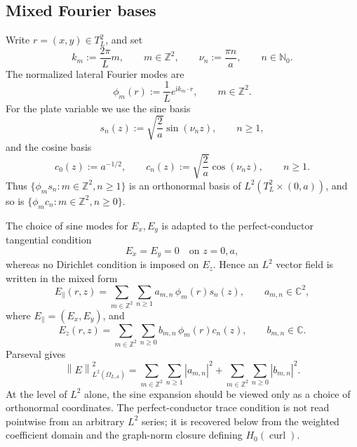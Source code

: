 \documentclass[11pt]{article}
\providecommand{\C}{\mathbb{C}}
\providecommand{\Z}{\mathbb{Z}}
\providecommand{\N}{\mathbb{N}}
\providecommand{\ii}{\mathrm{i}}
\providecommand{\abs}[1]{\left\lvert #1\right\rvert}
\providecommand{\norm}[1]{\left\lVert #1\right\rVert}
\providecommand{\OmegaLa}{\Omega_{L,a}}
\providecommand{\TtwoL}{T_L^2}
\providecommand{\Hzcurl}{H_0(\operatorname{curl})}
\numberwithin{equation}{section}
\begin{document}
\subsection{Mixed Fourier bases}
\label{subsec:mixed-fourier-bases}

Write \(r=(x,y)\in\TtwoL\), and set
\begin{equation}
\label{eq:km-nun-defs}
    k_m:=\frac{2\pi}{L}m,
    \qquad
    m\in\Z^2,
    \qquad
    \nu_n:=\frac{\pi n}{a},
    \qquad
    n\in\N_0 .
\end{equation}
The normalized lateral Fourier modes are
\begin{equation}
\label{eq:phi-m-def}
    \phi_m(r):=\frac1L e^{\ii k_m\cdot r},
    \qquad m\in\Z^2 .
\end{equation}
For the plate variable we use the sine basis
\begin{equation}
\label{eq:sin-basis-def}
    s_n(z):=\sqrt{\frac2a}\sin(\nu_n z),
    \qquad n\ge1,
\end{equation}
and the cosine basis
\begin{equation}
\label{eq:cos-basis-def}
    c_0(z):=a^{-1/2},
    \qquad
    c_n(z):=\sqrt{\frac2a}\cos(\nu_n z),
    \qquad n\ge1 .
\end{equation}
Thus \(\{\phi_m s_n:m\in\Z^2,n\ge1\}\) is an orthonormal basis of \(L^2(\TtwoL\times(0,a))\), and so is \(\{\phi_m c_n:m\in\Z^2,n\ge0\}\).

The choice of sine modes for \(E_x,E_y\) is adapted to the perfect-conductor tangential condition
\[
    E_x=E_y=0\quad\text{on }z=0,a,
\]
whereas no Dirichlet condition is imposed on \(E_z\).  Hence an \(L^2\) vector field is written in the mixed form
\begin{equation}
\label{eq:mixed-expansion-tangential}
    E_{\parallel}(r,z)
    =
    \sum_{m\in\Z^2}\sum_{n\ge1}
    a_{m,n}\,\phi_m(r)s_n(z),
    \qquad
    a_{m,n}\in\C^2,
\end{equation}
where \(E_{\parallel}=(E_x,E_y)\), and
\begin{equation}
\label{eq:mixed-expansion-normal}
    E_z(r,z)
    =
    \sum_{m\in\Z^2}\sum_{n\ge0}
    b_{m,n}\,\phi_m(r)c_n(z),
    \qquad
    b_{m,n}\in\C .
\end{equation}
Parseval gives
\begin{equation}
\label{eq:parseval-L2-mixed}
    \norm{E}_{L^2(\OmegaLa)}^2
    =
    \sum_{m\in\Z^2}\sum_{n\ge1}\abs{a_{m,n}}^2
    +
    \sum_{m\in\Z^2}\sum_{n\ge0}\abs{b_{m,n}}^2 .
\end{equation}
At the level of \(L^2\) alone, the sine expansion should be viewed only as a
choice of orthonormal coordinates.  The perfect-conductor trace condition is
not read pointwise from an arbitrary \(L^2\) series; it is recovered below
from the weighted coefficient domain and the graph-norm closure defining
\(\Hzcurl\).
\end{document}

